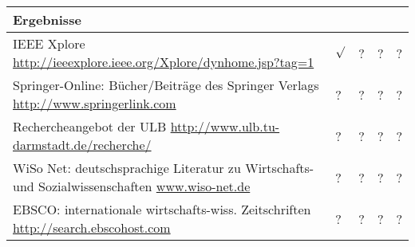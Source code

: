 \begin{tabular}{|p{}|p{}|p{}|p{
}|p{}|}
{Ergebnisse} \\
	\hline
	IEEE Xplore \newline 
	\url{http://ieeexplore.ieee.org/Xplore/dynhome.jsp?tag=1} & 
	$\surd$ & ? & ? & ? \\
	\hline
	Springer-Online: Bücher/Beiträge des Springer Verlags \newline
	\url{http://www.springerlink.com} & ? & ? & ? & ? \\
	\hline
	Rechercheangebot der ULB 
	\newline \url{http://www.ulb.tu-darmstadt.de/recherche/} & ? & ? & ? & ? 
\\
	\hline
	WiSo Net: deutschsprachige Literatur zu Wirtschafts- und 
	Sozialwissenschaften \newline \url{www.wiso-net.de} & ? & ? & ? & ? \\
	\hline
	EBSCO: internationale wirtschafts-wiss. Zeitschriften \newline 
	\url{http://search.ebscohost.com} & ? & ? & ? & ? \\
	\hline
\end{tabular}


\begin{comment}
\subsubsection{Sonstiges}
\begin{itemize}
\item \textbf{Google Scholar:} Suchdienst für wissenschaftliche Recherchen 
(http://scholar.google.de)
\item \textbf{Verlagswebseiten} Recherche und den Zugriff auf Zeitschriften- 
und 
Zeitungsartikel und E-Books
\item \textbf{Webseiten von Unternehmen} für die Recherche von 
Unternehmensdaten 
und-statistiken sowie Unternehmensdatenbanken
\item \textbf{Webseiten von Bundes- und Landesbehörden sowie der EU}
 Statistisches Bundesamt (http://www.destatis.de)
\\Presse- und Informationsamt der Bundesregierung 
(http://www.bundesregierung.de)
\item \textbf{Webseiten von Marktforschungsinstituten}
(für Marktanteile und Verbraucheranalysen)
\item \textbf{Webseiten von Verbänden und Kammern}
Institut der deutschen Wirtschaft (http://www.deutsche-wirtschaft.de)
\end{itemize}
\end{comment}
